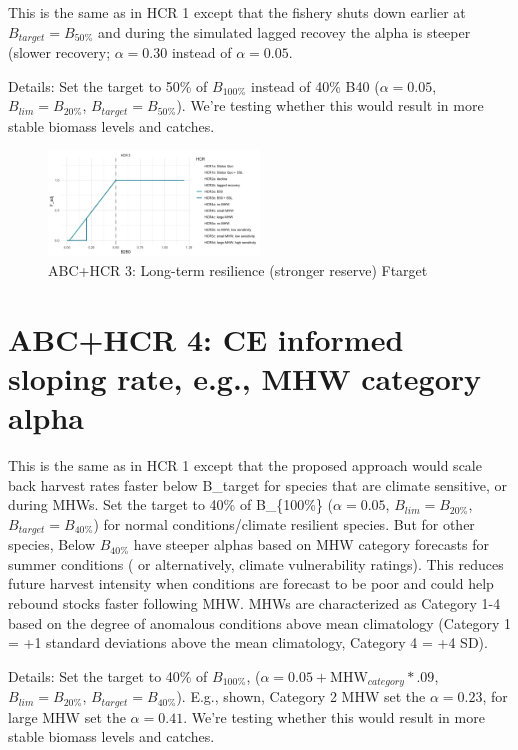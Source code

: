 \documentclass[
]{article}
\begin{document}
This is the same as in HCR 1 except that the fishery shuts down earlier
at \(B_{target} = B_{50\%}\) and during the simulated lagged recovey the
alpha is steeper (slower recovery; \(\alpha = 0.30\) instead of
\(\alpha = 0.05\).

Details: Set the target to 50\% of \(B_{100\%}\) instead of 40\% B40
(\(\alpha = 0.05\), \(B_{lim} = B_{20\%}\), \(B_{target} = B_{50\%}\)).
We're testing whether this would result in more stable biomass levels
and catches.

\begin{figure}
\centering
\includegraphics[width=0.5\textwidth,height=\textheight]{../../Figs/HCR_figs/HCR3.png}
\caption{ABC+HCR 3: Long-term resilience (stronger reserve) Ftarget}
\end{figure}

\section{ABC+HCR 4: CE informed sloping rate, e.g., MHW category
alpha}\label{abchcr-4-ce-informed-sloping-rate-e.g.-mhw-category-alpha}

This is the same as in HCR 1 except that the proposed approach would
scale back harvest rates faster below B\_target for species that are
climate sensitive, or during MHWs. Set the target to 40\% of
B\_\{100\%\} (\(\alpha = 0.05\), \(B_{lim} = B_{20\%}\),
\(B_{target} = B_{40\%}\)) for normal conditions/climate resilient
species. But for other species, Below \(B_{40\%}\) have steeper alphas
based on MHW category forecasts for summer conditions ( or
alternatively, climate vulnerability ratings). This reduces future
harvest intensity when conditions are forecast to be poor and could help
rebound stocks faster following MHW. MHWs are characterized as Category
1-4 based on the degree of anomalous conditions above mean climatology
(Category 1 = +1 standard deviations above the mean climatology,
Category 4 = +4 SD).

Details: Set the target to 40\% of \(B_{100\%}\),
(\(\alpha = 0.05+\mathrm{MHW}_{category}*.09\), \(B_{lim} = B_{20\%}\),
\(B_{target} = B_{40\%}\)). E.g., shown, Category 2 MHW set the
\(\alpha = 0.23\), for large MHW set the \(\alpha = 0.41\). We're
testing whether this would result in more stable biomass levels and
catches.
\end{document}
